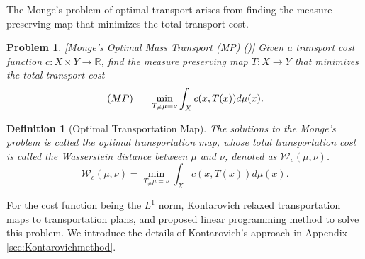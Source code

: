 \documentclass{article}
\newtheorem{definition}[theorem]{Definition}
\newtheorem{problem}[theorem]{Problem}
\begin{document}
The Monge's problem of optimal transport arises from finding the measure-preserving map that minimizes the total transport cost.
\begin{problem}
\label{prob: Monge}
[Monge's Optimal Mass Transport (MP)  (\cite{bonnotte2013knothe})] Given a transport cost function $c: X\times Y\to \mathbb{R}$, find the measure preserving map $T:X\to Y$ that minimizes the total transport cost
\begin{equation}
(MP)\hspace{6mm}  \min_{T_{\#}\mu=\nu} \int_X c(x,T(x)) d\mu(x).
    \label{eq:MP}
\end{equation}
\end{problem}
\begin{definition}[Optimal Transportation Map]
The solutions to the Monge's problem is called the \emph{optimal transportation map}, whose  total transportation cost is called the \emph{Wasserstein distance} between $\mu$ and $\nu$, denoted as $\mathcal{W}_c(\mu,\nu)$.
\begin{equation}
    \mathcal{W}_{c}(\mu,\nu) = \min_{T_\#\mu=\nu} \int_X c(x,T(x)) d\mu(x).
\end{equation}
\end{definition}
For the cost function being the $L^1$ norm, Kontarovich relaxed transportation maps to transportation plans, and proposed linear programming method to solve this problem. We introduce the details of Kontarovich's approach in Appendix \ref{sec:Kontarovichmethod}.
\end{document}

